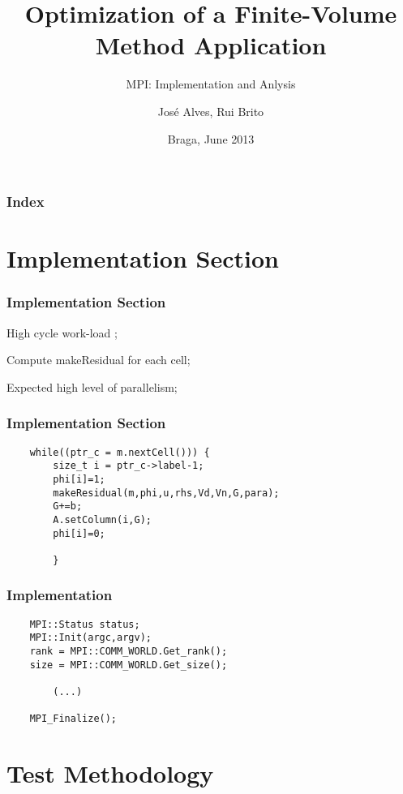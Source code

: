 \documentclass{beamer}
\title{Optimization of a Finite-Volume Method Application}
\subtitle{MPI: Implementation and Anlysis}
\author{José Alves, Rui Brito}
\institute[22765, 22781]{
	Universidade do Minho
}
\date{Braga, June 2013}
\begin{document}

\maketitle%

\begin{frame}
	\frametitle{Index}
	\tableofcontents
\end{frame}

\section{Implementation Section}

\begin{frame}[plain]
	\frametitle{Implementation Section}
	\begin{description}
		\item High cycle work-load ;
		\item Compute makeResidual for each cell;
		\item Expected high level of parallelism;
	\end{description}
\end{frame}

\begin{frame}[plain]
	\frametitle{Implementation Section}
	\begin{Verbatim}
	while((ptr_c = m.nextCell())) {
        size_t i = ptr_c->label-1;                                
        phi[i]=1;        
        makeResidual(m,phi,u,rhs,Vd,Vn,G,para); 
        G+=b;
        A.setColumn(i,G);
        phi[i]=0;

        }
	\end{Verbatim}
\end{frame}

\begin{frame}[plain]
	\frametitle{Implementation}
	\begin{Verbatim}
	MPI::Status status;    
    MPI::Init(argc,argv);    
    rank = MPI::COMM_WORLD.Get_rank();    
    size = MPI::COMM_WORLD.Get_size();

    	(...)

    MPI_Finalize();
	\end{Verbatim}
\end{frame}


\section{Test Methodology}
\end{document}
